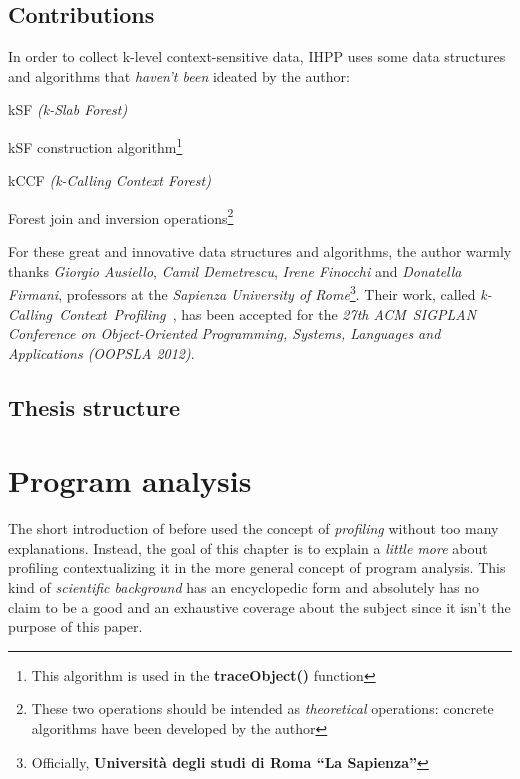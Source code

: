 \documentclass[a4paper,11pt]{report}
\begin{document}
\section{Contributions}

In order to collect k-level context-sensitive data, IHPP uses some data
structures and algorithms that \emph{haven't been} ideated by the author:

\begin{itemize*}
\item kSF \emph{(k-Slab Forest)}
\item kSF construction algorithm\footnote{This algorithm is used in the \textbf{traceObject()} function}
\item kCCF \emph{(k-Calling Context Forest)}
\item Forest join and inversion operations\footnote{These two operations should
be intended as \emph{theoretical} operations: concrete algorithms have been
developed by the author}
\end{itemize*}

For these great and innovative data structures and algorithms, the author warmly
thanks \emph{Giorgio Ausiello}, \emph{Camil Demetrescu}, \emph{Irene Finocchi}
and \emph{Donatella Firmani}, professors at the \emph{Sapienza University of
Rome}\footnote{Officially, \textbf{Universit\`a degli studi di Roma ``La
Sapienza''}}. Their work, called \emph{\mbox{k-Calling Context Profiling}~\cite{kCCF}}, has
been accepted for the \emph{27th \mbox{ACM SIGPLAN} Conference on
Object-Oriented Programming, Systems, Languages and Applications (OOPSLA 2012)}.

\section{Thesis structure}

\chapter{Program analysis}
The short introduction of before used the concept of \emph{profiling} without
too many explanations.
Instead, the goal of this chapter is to explain a \emph{little more} about
profiling contextualizing it in the more general concept of program analysis.
This kind of \emph{scientific background} has an encyclopedic form and
absolutely has no claim to be a good and an exhaustive coverage about the
subject since it isn't the purpose of this paper.\\
\end{document}
